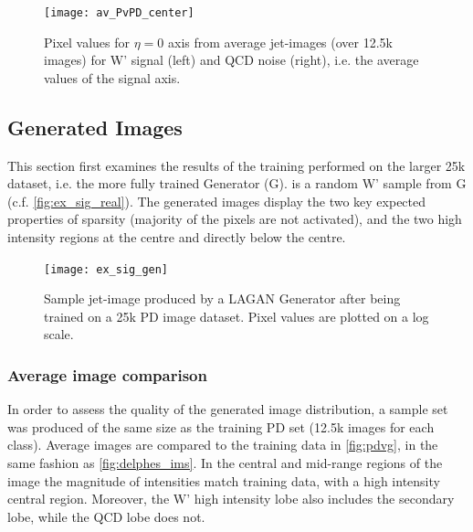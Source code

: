 \documentclass[twocolumn]{article}
\newcommand{\around}{{\raise.17ex\hbox{$\scriptstyle\sim$}}}
\begin{document}
\begin{figure}[!htbp]
	\centering
	\texttt{[image: av\_PvPD\_center]}
	
	\caption{Pixel values for $\eta=0$ axis from average jet-images (over 12.5k images)  for W' signal (left) and QCD noise (right), i.e. the average values of the signal axis.}
	\label{fig:delphes_middle}
	
\end{figure} 

\subsection{Generated Images}
\label{sec:genims}

This section first examines the results of the training performed on the larger 25k dataset, i.e. the more fully trained Generator (G).  is a random W' sample from G (c.f. \cref{fig:ex_sig_real}). The generated images display the two key expected properties of sparsity (majority of the pixels are not activated), and the two high intensity regions at the centre and directly below the centre.
\begin{figure}[H]
	\centering
	\texttt{[image: ex\_sig\_gen]}
	
	\caption{Sample jet-image produced by a LAGAN Generator after being trained on a 25k PD image dataset. Pixel values are plotted on a log scale.}
	\label{fig:ex_sig_gen}
	
\end{figure}

\subsubsection{Average image comparison}
In order to assess the quality of the generated image distribution, a sample set was produced of the same size as the training PD set (12.5k images for each class). Average images are compared to the training data in \cref{fig:pdvg}, in the same fashion as \cref{fig:delphes_ims}. In the central and mid-range regions of the image the magnitude of intensities match training data, with a high intensity central region. Moreover, the W' high intensity lobe also includes the secondary lobe, while the QCD lobe does not.
\end{document}
